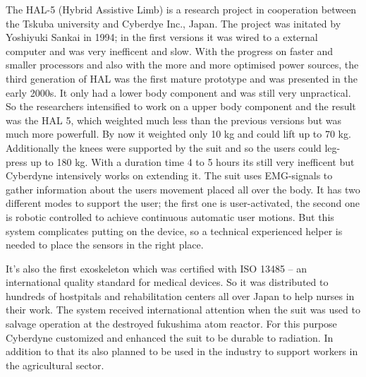 \documentclass[letterpaper, 10 pt, conference]{ieeeconf}  %
\begin{document}

The HAL-5 (Hybrid Assistive Limb) is a research project in cooperation between the Tskuba university and Cyberdye Inc., Japan. The project was initated by Yoshiyuki Sankai in 1994; in the first versions it was wired to a external computer and was very inefficent and slow. With the progress on faster and smaller processors and also with the more and more optimised power sources, the third generation of HAL was the first mature prototype and was presented in the early 2000s. It only had a lower body component and was still very unpractical. So the researchers intensified to work on a upper body component and the result was the HAL 5, which weighted much less than the previous versions but was much more powerfull. By now it weighted only 10 kg and could lift up to 70 kg. Additionally the knees were supported by the suit and so the users could leg-press up to 180 kg. With a duration time 4 to 5 hours its still very inefficent but Cyberdyne intensively works on extending it. The suit uses EMG-signals to gather information about the users movement placed all over the body. It has two different modes to support the user; the first one is user-activated, the second one is robotic controlled to achieve continuous automatic user motions. But this system complicates putting on the device, so a technical experienced helper is needed to place the sensors in the right place.


It's also the first exoskeleton which was certified with ISO 13485 – an international quality standard for medical devices. So it was distributed to hundreds of hostpitals and rehabilitation centers all over Japan to help nurses in their work. The system received international attention when the suit was used to salvage operation at the destroyed fukushima atom reactor. For this purpose Cyberdyne customized and enhanced the suit to be durable to radiation. In addition to that its also planned to be used in the industry to support workers in the agricultural sector. 

\end{document}
